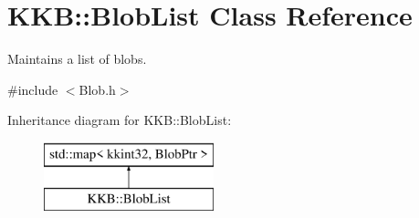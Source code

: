 \hypertarget{class_k_k_b_1_1_blob_list}{}\section{K\+KB\+:\+:Blob\+List Class Reference}
\label{class_k_k_b_1_1_blob_list}


Maintains a list of blobs.  




{\ttfamily \#include $<$Blob.\+h$>$}

Inheritance diagram for K\+KB\+:\+:Blob\+List\+:\begin{figure}[H]
\begin{center}
\leavevmode
\includegraphics[height=2.000000cm]{class_k_k_b_1_1_blob_list}
\end{center}
\end{figure}
